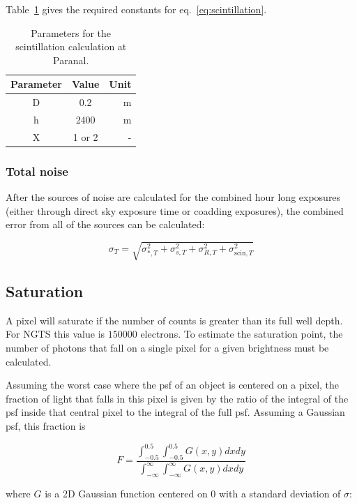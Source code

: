 \documentclass[a4paper]{report}
\begin{document}
Table~\ref{tab:scintillationparams} gives the required constants for
eq.~\ref{eq:scintillation}.


\begin{table}
    \centering
    \begin{tabular}{ccr}
        \toprule
        Parameter & Value & Unit \\
        \midrule
        D & 0.2 & m \\
        h & 2400 & m \\
        X & 1 or 2 & - \\
        \bottomrule
    \end{tabular}
    \caption{Parameters for the scintillation calculation at Paranal.}
    \label{tab:scintillationparams}
\end{table}


\subsubsection{Total noise}

After the sources of noise are calculated for the combined hour long 
exposures (either through direct sky exposure time or coadding 
exposures), the combined error from all of the sources can be
calculated:

\[
    \sigma_T = \sqrt{\sigma_{\ast,T}^2 + \sigma_{s,T}^2 + \sigma_{R,T}^2 +
    \sigma_{\mathrm{scin},T}^2}
    \]





\subsection{Saturation}

A pixel will saturate if the number of counts is greater than its 
full well depth. For NGTS this value is $150000$ electrons. To 
estimate the saturation point, the number of photons that fall on 
a single pixel for a given brightness must be calculated. 

Assuming the worst case where the psf of an object is centered on 
a pixel, the fraction of light that falls in this pixel is given 
by the ratio of the integral of the psf inside that central pixel to
the integral of the full psf. Assuming a Gaussian psf, this fraction is

\[
    F = \frac{\int_{-0.5}^{0.5}\int_{-0.5}^{0.5} G(x,y) dx dy}
    {\int_{-\infty}^{\infty}\int_{-\infty}^{\infty} G(x,y) dx dy}
    \]

where $G$ is a 2D Gaussian function centered on $0$ with a standard
deviation of $\sigma$:  
\end{document}
